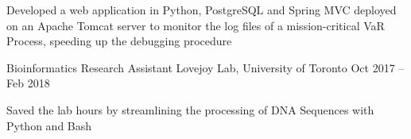 \begin{cventries}
{\begin{cvitems}
        \item {Developed a web application in Python, PostgreSQL and Spring MVC deployed on an Apache Tomcat server to monitor the log files of a mission-critical VaR Process, speeding up the debugging procedure}
      \end{cvitems}
    }
  \cventry
    {Bioinformatics Research Assistant}
    {Lovejoy Lab, University of Toronto}
    {}
    {Oct 2017 -- Feb 2018}
    {}
    {
      \begin{cvitems}
        \item {Saved the lab hours by streamlining the processing of DNA Sequences with Python and Bash}
      \end{cvitems}
    }
\end{cventries}
